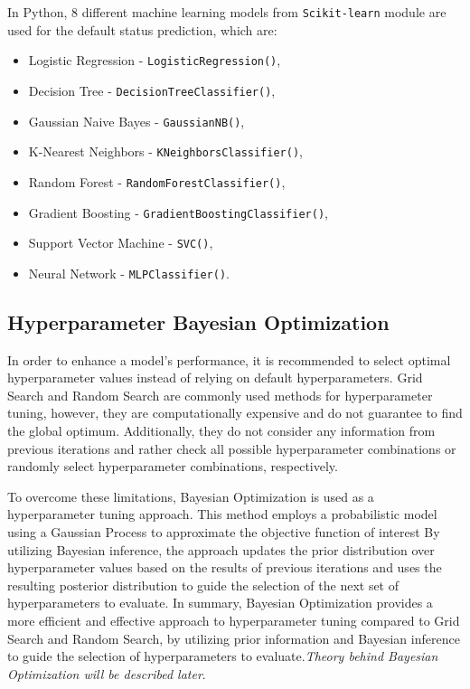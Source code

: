 In Python, 8 different machine learning models from \lstinline{Scikit-learn} module are used for the default status prediction, which are:
\begin{itemize}\setlength\itemsep{0em}
    \item Logistic Regression - \lstinline{LogisticRegression()},
    \item Decision Tree - \lstinline{DecisionTreeClassifier()},
    \item Gaussian Naive Bayes - \lstinline{GaussianNB()},
    \item K-Nearest Neighbors - \lstinline{KNeighborsClassifier()},
    \item Random Forest - \lstinline{RandomForestClassifier()},
    \item Gradient Boosting - \lstinline{GradientBoostingClassifier()},
    \item Support Vector Machine - \lstinline{SVC()},
    \item Neural Network - \lstinline{MLPClassifier()}.
\end{itemize}

\subsection{Hyperparameter Bayesian Optimization}

In order to enhance a model's performance, it is recommended to select optimal hyperparameter values instead of relying on default hyperparameters.
Grid Search and Random Search are commonly used methods for hyperparameter tuning, however, they are computationally expensive and do not guarantee to find the global optimum.
Additionally, they do not consider any information from previous iterations and rather check all possible hyperparameter combinations or randomly select hyperparameter combinations, respectively.

To overcome these limitations, Bayesian Optimization is used as a hyperparameter tuning approach.
This method employs a probabilistic model using a Gaussian Process to approximate the objective function of interest
 By utilizing Bayesian inference, the approach updates the prior distribution over hyperparameter values based on the results of previous iterations and uses the resulting posterior distribution to guide the selection of the next set of hyperparameters to evaluate.
In summary, Bayesian Optimization provides a more efficient and effective approach to hyperparameter tuning compared to Grid Search and Random Search, by utilizing prior information and Bayesian inference to guide the selection of hyperparameters to evaluate.\textit{Theory behind Bayesian Optimization will be described later}.





